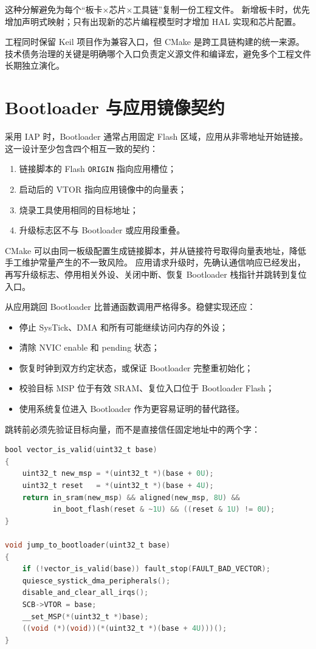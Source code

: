 这种分解避免为每个“板卡×芯片×工具链”复制一份工程文件。
新增板卡时，优先增加声明式映射；只有出现新的芯片编程模型时才增加 HAL 实现和芯片配置。

工程同时保留 Keil 项目作为兼容入口，但 CMake 是跨工具链构建的统一来源。
技术债务治理的关键是明确哪个入口负责定义源文件和编译宏，避免多个工程文件长期独立演化。

\section{Bootloader 与应用镜像契约}

采用 IAP 时，Bootloader 通常占用固定 Flash 区域，应用从非零地址开始链接。
这一设计至少包含四个相互一致的契约：
\begin{enumerate}
  \item 链接脚本的 Flash \texttt{ORIGIN} 指向应用槽位；
  \item 启动后的 VTOR 指向应用镜像中的向量表；
  \item 烧录工具使用相同的目标地址；
  \item 升级标志区不与 Bootloader 或应用段重叠。
\end{enumerate}

CMake 可以由同一板级配置生成链接脚本，并从链接符号取得向量表地址，降低手工维护常量产生的不一致风险。
应用请求升级时，先确认通信响应已经发出，再写升级标志、停用相关外设、关闭中断、恢复 Bootloader 栈指针并跳转到复位入口。

从应用跳回 Bootloader 比普通函数调用严格得多。稳健实现还应：
\begin{itemize}
  \item 停止 SysTick、DMA 和所有可能继续访问内存的外设；
  \item 清除 NVIC enable 和 pending 状态；
  \item 恢复时钟到双方约定状态，或保证 Bootloader 完整重初始化；
  \item 校验目标 MSP 位于有效 SRAM、复位入口位于 Bootloader Flash；
  \item 使用系统复位进入 Bootloader 作为更容易证明的替代路径。
\end{itemize}

跳转前必须先验证目标向量，而不是直接信任固定地址中的两个字：

\begin{lstlisting}[language=C,caption={Bootloader 跳转的最小校验框架}]
bool vector_is_valid(uint32_t base)
{
    uint32_t new_msp = *(uint32_t *)(base + 0U);
    uint32_t reset   = *(uint32_t *)(base + 4U);
    return in_sram(new_msp) && aligned(new_msp, 8U) &&
           in_boot_flash(reset & ~1U) && ((reset & 1U) != 0U);
}

void jump_to_bootloader(uint32_t base)
{
    if (!vector_is_valid(base)) fault_stop(FAULT_BAD_VECTOR);
    quiesce_systick_dma_peripherals();
    disable_and_clear_all_irqs();
    SCB->VTOR = base;
    __set_MSP(*(uint32_t *)base);
    ((void (*)(void))(*(uint32_t *)(base + 4U)))();
}
\end{lstlisting}

